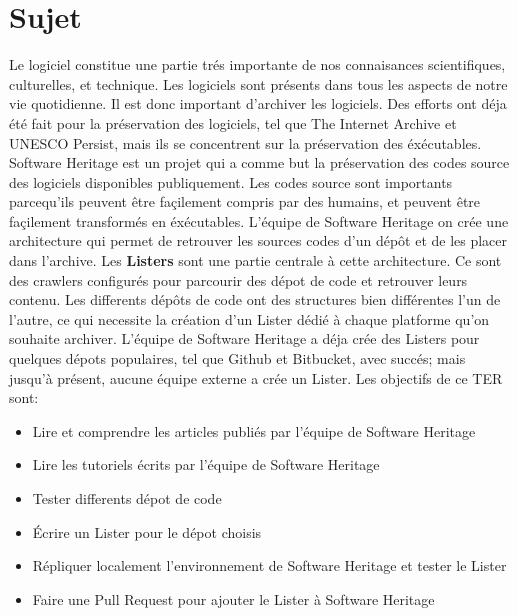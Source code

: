 \documentclass[12pt,a4paper]{report}
\begin{document}
\chapter{Sujet}
Le logiciel constitue une partie trés importante de nos connaisances scientifiques, culturelles, et technique. Les logiciels sont présents dans tous les aspects de notre vie quotidienne. Il est donc important d'archiver les logiciels.\newline
Des efforts ont déja été fait pour la préservation des logiciels, tel que The Internet Archive et UNESCO Persist, mais ils se concentrent sur la préservation des éxécutables.
Software Heritage est un projet qui a comme but la préservation des codes source des logiciels disponibles publiquement. Les codes source sont importants parcequ'ils peuvent être façilement compris par des humains, et peuvent être façilement transformés en éxécutables.\newline
L'équipe de Software Heritage on crée une architecture qui permet de retrouver les sources codes d'un dépôt et de les placer dans l'archive. Les \textbf{Listers} sont une partie centrale à cette architecture. Ce sont des crawlers configurés pour parcourir des dépot de code et retrouver leurs contenu. Les differents dépôts de code ont des structures bien différentes l'un de l'autre, ce qui necessite la création d'un Lister dédié à chaque platforme qu'on souhaite archiver. L'équipe de Software Heritage a déja crée des Listers pour quelques dépots populaires, tel que Github et Bitbucket, avec succés; mais jusqu'à présent, aucune équipe externe a crée un Lister. \newline
Les objectifs de ce TER sont:
\begin{itemize}
  \item Lire et comprendre les articles publiés par l'équipe de Software Heritage
  \item Lire les tutoriels écrits par l'équipe de Software Heritage
  \item Tester differents dépot de code
  \item Écrire un Lister pour le dépot choisis
  \item Répliquer localement l'environnement de Software Heritage et tester le Lister
  \item Faire une Pull Request pour ajouter le Lister à Software Heritage
\end{itemize}
\end{document}

